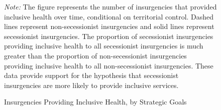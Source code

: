 \documentclass[12pt, letterpaper]{article}
\begin{document}
\newpage
\clearpage
\begin{center}
\begin{figure}[h!]
\renewcommand\thefigure{A.\arabic{figure}}
\begin{center}
\caption{Insurgencies Providing Inclusive Health, by Strategic Goals}
\label{pghealth}
\end{center}
\begin{tablenotes}
\raggedright \footnotesize{\textit{Note:} \footnotesize The figure represents the number of insurgencies that provided inclusive health over time, conditional on territorial control. Dashed lines represent non-secessionist insurgencies and solid lines represent secessionist insurgencies. The proportion of secessionist insurgencies providing inclusive health to all secessionist insurgencies is much greater than the proportion of non-secessionist insurgencies providing inclusive health to all non-secessionist insurgencies. These data provide support for the hypothesis that secessionist insurgencies are more likely to provide inclusive services.} 
\end{tablenotes}
\end{figure}
\end{center}
\end{document}
